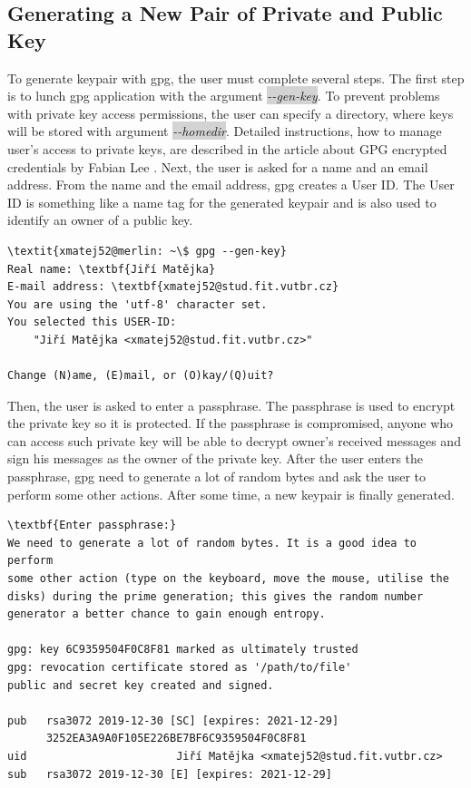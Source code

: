 \subsection*{Generating a New Pair of Private and Public Key}
To generate keypair with gpg, the user must complete several steps. The first step is to lunch gpg application with the argument \colorbox{lightgray}{\textit{-{}-gen-key}}. To prevent problems with private key access permissions, the user can specify a directory, where keys will be stored with argument \colorbox{lightgray}{\textit{-{}-homedir}}. Detailed instructions, how to manage user's access to private keys, are described in the article about GPG encrypted credentials by Fabian Lee \cite{gpgAccess}.  Next, the user is asked for a name and an email address. From the name and the email address, gpg creates a User ID. The User ID is something like a name tag for the generated keypair and is also used to identify an owner of a public key.
\begin{Verbatim}[commandchars=\\\{\},codes={\catcode`$=3\catcode`_=8},samepage=false,frame=single]
\textit{xmatej52@merlin: ~\$ gpg --gen-key}
Real name: \textbf{Jiří Matějka}
E-mail address: \textbf{xmatej52@stud.fit.vutbr.cz}
You are using the 'utf-8' character set.
You selected this USER-ID:
    "Jiří Matějka <xmatej52@stud.fit.vutbr.cz>"

Change (N)ame, (E)mail, or (O)kay/(Q)uit?
\end{Verbatim}

Then, the user is asked to enter a passphrase. The passphrase is used to encrypt the private key so it is protected. If the passphrase is compromised, anyone who can access such private key will be able to decrypt owner's received messages and sign his messages as the owner of the private key. After the user enters the passphrase, gpg need to generate a lot of random bytes and ask the user to perform some other actions. After some time, a new keypair is finally generated.
\begin{Verbatim}[commandchars=\\\{\},codes={\catcode`$=3\catcode`_=8},samepage=false,frame=single]
\textbf{Enter passphrase:}
We need to generate a lot of random bytes. It is a good idea to perform
some other action (type on the keyboard, move the mouse, utilise the
disks) during the prime generation; this gives the random number
generator a better chance to gain enough entropy.

gpg: key 6C9359504F0C8F81 marked as ultimately trusted
gpg: revocation certificate stored as '/path/to/file'
public and secret key created and signed.

pub   rsa3072 2019-12-30 [SC] [expires: 2021-12-29]
      3252EA3A9A0F105E226BE7BF6C9359504F0C8F81
uid                       Jiří Matějka <xmatej52@stud.fit.vutbr.cz>
sub   rsa3072 2019-12-30 [E] [expires: 2021-12-29]
\end{Verbatim}

